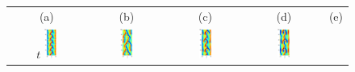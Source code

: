 \begin{figure}[t]
\begin{center}
\begin{tabular}{ccccc} (a) & (b) & (c) & (d) & (e)\\
$t$
\includegraphics[width=0.18\textwidth]{figs/ks22rpo020.5-00.00.eps}\hspace{-3ex} &
\includegraphics[width=0.18\textwidth]{figs/ks22rpo064.7-00.00.eps}\hspace{-3ex} &
\includegraphics[width=0.18\textwidth]{figs/ks22rpo066.8-00.00.eps}\hspace{-3ex} &
\includegraphics[width=0.18\textwidth]{figs/ks22rpo070.3-00.00.eps}\hspace{-3ex} &

\end{tabular}
\end{center}
\end{figure}
